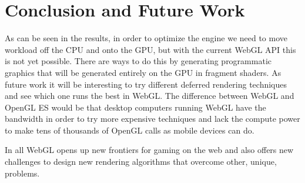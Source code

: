 \chapter{Conclusion and Future Work}
\label{chapter:Chapter 6}

As can be seen in the results, in order to optimize the engine we need to move workload off the CPU and onto the GPU, but with the current WebGL API this is not yet possible. There are ways to do this by generating programmatic graphics that will be generated entirely on the GPU in fragment shaders. 
As future work it will be interesting to try different deferred rendering techniques and see which one runs the best in WebGL. The difference between WebGL and OpenGL ES would be that desktop computers running WebGL have the bandwidth in order to try more expensive techniques and lack the compute power to make tens of thousands of OpenGL calls as mobile devices can do. 

In all WebGL opens up new frontiers for gaming on the web and also offers new challenges to design new rendering algorithms that overcome other, unique, problems.